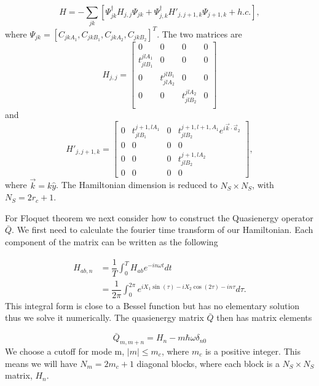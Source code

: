 \begin{equation}
  H = -\sum_{jk} \left[ \Psi^{\dagger}_{jk} H_{j,j} \Psi_{jk} + \Psi^{\dagger}_{j,k} H'_{j,j+1,k} \Psi_{j+1,k} + h.c. \right],
\end{equation}
where $\Psi_{jk} = [C_{jkA_1}, C_{jkB_1}, C_{jkA_2}, C_{jkB_2}]^T$. The two matrices are
\[
  H_{j,j} =
  \begin{bmatrix}
    0 & 0 & 0 & 0 \\
    t^{jlA_1}_{jlB_1} & 0 & 0 & 0 \\
    0 & t^{jlB_1}_{jlA_2} & 0 & 0 \\
    0 & 0 & t^{jlA_2}_{jlB_2} & 0 \\
  \end{bmatrix}
\]
and
\[
  H'_{j,j+1,k} =
  \begin{bmatrix}
    0 & t^{j+1,lA_1}_{jlB_1} & 0 & t^{j+1,l+1,A_1}_{jlB_2} e^{i\vec{k}\cdot\vec{a}_2} \\
    0 & 0 & 0 & 0 \\
    0 & 0 & 0 & t^{j+1,lA_2}_{jlB_2} \\
    0 & 0 & 0 & 0
  \end{bmatrix},
\]
where $\vec{k} = k \hat{y}$.
The Hamiltonian dimension is reduced to $N_S \times N_S$, with $N_S = 2r_c+1$.

For Floquet theorem we next consider how to construct the Quasienergy operator $\bar{Q}$.
We first need to calculate the fourier time transform of our Hamiltonian.
Each component of the matrix can be written as the following

\begin{align}
  H_{ab, n} &= \dfrac{1}{T} \int^T_0 H_{ab} e^{-i n \omega t} dt \nonumber \\
  &= \dfrac{1}{2\pi} \int^{2\pi}_0 e^{iX_1\sin(\tau) - iX_2\cos(2\tau) - i n \tau} d\tau.
\end{align}
This integral form is close to a Bessel function but has no elementary solution thus we solve it numerically.
The quasienergy matrix $\bar{Q}$ then has matrix elements

\begin{equation}
  \bar{Q}_{m,m+n} = H_n - m \hbar \omega \delta_{n0}
\end{equation}
We choose a cutoff for mode m, $|m| \leq m_c$, where $m_c$ is a positive integer.
This means we will have $N_m = 2 m_c +1$ diagonal blocks, where each block is a $N_S \times N_S$ matrix, $H_n$.

